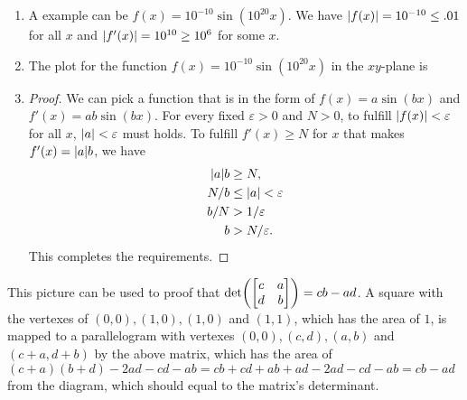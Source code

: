 \documentclass[8pt]{article}
\begin{document}
\begin{Answer}[number=26]
  \begin{enumerate}
    \item A example can be $f(x)=10^{-10}\sin(10^{20}x)$. We have
      $\abs{f(x)}=10^{-10}\le.01$ for all $x$ and $\abs{f'(x)}=10^{10}\ge10^6$ for some $x$.
    \item The plot for the function $f(x)=10^{-10}\sin(10^{20}x)$ in the
      $xy$-plane is

    \item \begin{proof}
        We can pick a function that is in the form of $f(x) = a\sin(bx)$ and
        $f'(x)=ab\sin(bx)$. For every fixed $\varepsilon> 0$ and $N> 0$, to
        fulfill $\abs{f(x)}<\varepsilon$ for all $x$, $\abs{a} < \varepsilon$
        must holds. To fulfill $f'(x)\ge N$ for $x$ that makes $f'(x)=\abs{a}b$,
        we have
        \begin{align*}
          \abs{a}b &\ge N, \\
          N/b &\le \abs{a} < \varepsilon  \\
          b/N &> 1/\varepsilon  \\
          b &> N/\varepsilon.
        \end{align*}
        This completes the requirements.
    \end{proof}
  \end{enumerate}
\end{Answer}

\begin{Answer}[number=27]
  This picture can be used to proof that \(\det(\mqty[c & a \\ d & b]) =
  cb-ad\). A square with the
  vertexes of $(0,0), (1, 0), (1, 0)$ and $(1,1)$, which has the area of $1$,
  is mapped to a parallelogram with vertexes $(0,0), (c,d), (a, b)$ and $(c+a,
  d+b)$ by the above matrix, which has the area of $(c+a)(b+d)-2ad-cd-ab=cb+cd+ab+ad-2ad-cd-ab =
  cb-ad$ from the diagram, which should equal to the matrix's determinant.
\end{Answer}
\end{document}
